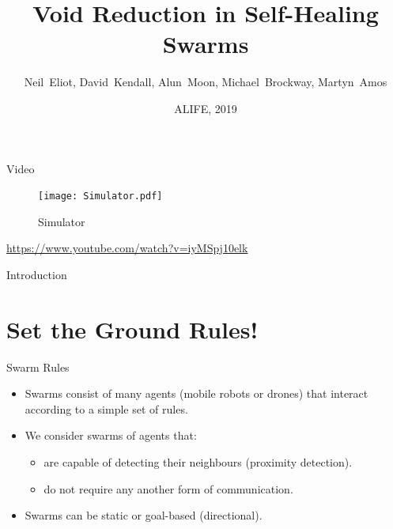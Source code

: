 \documentclass{beamer}
\title{Void Reduction in Self-Healing Swarms}
\author[N.~Eliot et al.]{Neil~Eliot, David~Kendall, Alun~Moon, Michael~Brockway, Martyn~Amos}
\institute[Northumbria University] %
{
  Department of Computer and Information Sciences\\
  University of Northumbria
}
\date{ALIFE, 2019}
\begin{document}
\begin{frame}
  \titlepage
\end{frame}

\begin{frame}{Video}
  \begin{center}
    \begin{figure}
      \begin{center}
        \texttt{[image: Simulator.pdf]}
      \end{center}
      \caption{Simulator}
    \end{figure}
    \href{https://www.youtube.com/watch?v=iyMSpj10elk}{https://www.youtube.com/watch?v=iyMSpj10elk}
  \end{center}
\end{frame}  

\begin{frame}{Introduction}
  \tableofcontents
\end{frame}


\section{Set the Ground Rules!}

\begin{frame}{Swarm Rules}
  \begin{itemize}
  \item {
    Swarms consist of many agents (mobile robots or drones) that interact according to a simple set of rules.
  }
  \item {
    We consider swarms of agents that:
    \begin{itemize}
      \item are capable of detecting their neighbours (proximity detection). 
      \item do not require any another form of communication. 
    \end{itemize}
  }
  \item {
    Swarms can be static or goal-based (directional).
  }
  \end{itemize}
\end{frame}
\end{document}
